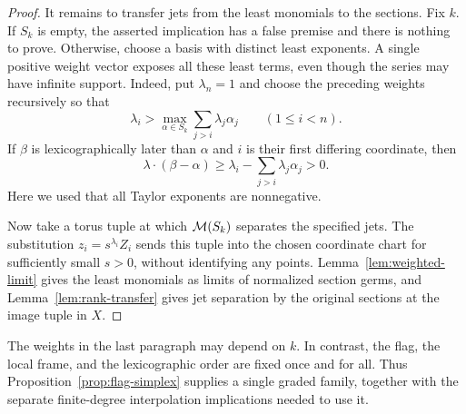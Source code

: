 \begin{proof}
It remains to transfer jets from the least monomials to the sections. Fix
$k$. If $S_k$ is empty, the asserted implication has a false premise and
there is nothing to prove. Otherwise, choose a basis with distinct least
exponents. A single positive
weight vector exposes all these least terms, even though the series may
have infinite support. Indeed, put $\lambda_n=1$ and choose the preceding
weights recursively so that
\begin{equation}\label{eq:lex-exposing-weights}
 \lambda_i>
 \max_{\alpha\in S_k}\sum_{j>i}\lambda_j\alpha_j
 \qquad(1\leq i<n).
\end{equation}
If $\beta$ is lexicographically later than $\alpha$ and $i$ is their
first differing coordinate, then
\[
 \lambda\cdot(\beta-\alpha)
 \geq\lambda_i-\sum_{j>i}\lambda_j\alpha_j>0.
\]
Here we used that all Taylor exponents are nonnegative.

Now take a torus tuple at which $\mathcal M(S_k)$ separates the specified jets.
The substitution $z_i=s^{\lambda_i}Z_i$ sends this tuple into the chosen
coordinate chart for sufficiently small $s>0$, without identifying any
points. Lemma~\ref{lem:weighted-limit} gives the least monomials as limits
of normalized section germs, and Lemma~\ref{lem:rank-transfer} gives jet
separation by the original sections at the image tuple in $X$.
\end{proof}

The weights in the last paragraph may depend on $k$. In contrast, the flag,
the local frame, and the lexicographic order are fixed once and for all.
Thus Proposition~\ref{prop:flag-simplex} supplies a single graded family,
together with the separate finite-degree interpolation implications needed
to use it.
